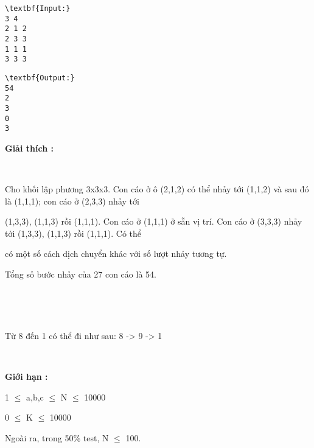 \begin{verbatim}
\textbf{Input:}
3 4
2 1 2
2 3 3
1 1 1
3 3 3\end{verbatim}
\begin{verbatim}
\textbf{Output:}
54
2
3
0
3\end{verbatim}

\textbf{Giải thích : }

 

Cho khối lập phương 3x3x3. Con cáo ở ô (2,1,2) có thể nhảy tới (1,1,2) và sau đó là (1,1,1); con cáo ở (2,3,3) nhảy tới

(1,3,3), (1,1,3) rồi (1,1,1). Con cáo ở (1,1,1) ở sẵn vị trí. Con cáo ở (3,3,3) nhảy tới (1,3,3), (1,1,3) rồi (1,1,1). Có thể

có một số cách dịch chuyển khác với số lượt nhảy tương tự.

Tổng số bước nhảy của 27 con cáo là 54.

 

 

Từ 8 đến 1 có thể đi như sau: 8 -> 9 -> 1

 

\textbf{Giới hạn : }

1 $\le$ a,b,c $\le$ N $\le$ 10000

0 $\le$ K $\le$ 10000

Ngoài ra, trong 50\% test, N $\le$ 100.